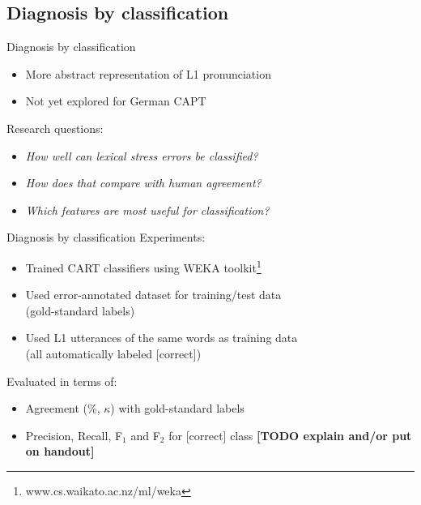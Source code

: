 \documentclass[xcolor={dvipsnames}]{beamer}
\newcommand{\TODO}[1]{{\color{red}\textbf{[TODO #1]}}}
\begin{document}
		
		
	\subsection{Diagnosis by classification}
		\begin{frame}{Diagnosis by classification}
		\begin{itemize}
		\item More abstract representation of L1 pronunciation
		\item Not yet explored for German CAPT
		\end{itemize}
		\vfill
		Research questions:
		\begin{itemize}
		\item \textit{How well can lexical stress errors be classified?}
		\item \textit{How does that compare with human agreement?}
		\item \textit{Which features are most useful for classification?}
		\end{itemize}	
		\end{frame}	
		
		\begin{frame}{Diagnosis by classification}
		Experiments:
		\begin{itemize}
		\item Trained CART classifiers using WEKA toolkit\footnote{www.cs.waikato.ac.nz/ml/weka}
		\item Used error-annotated dataset for training/test data\\(gold-standard labels)
		\item Used L1 utterances of the same words as training data \\(all automatically labeled [correct])
		\end{itemize}
		
		\vfill
		
		Evaluated in terms of:
		\begin{itemize}
		\item Agreement (\%, $\kappa$) with gold-standard labels
		\item Precision, Recall, F$_1$ and F$_2$ for [correct] class \TODO{explain and/or put on handout}
		\end{itemize}
		\end{frame}
\end{document}

